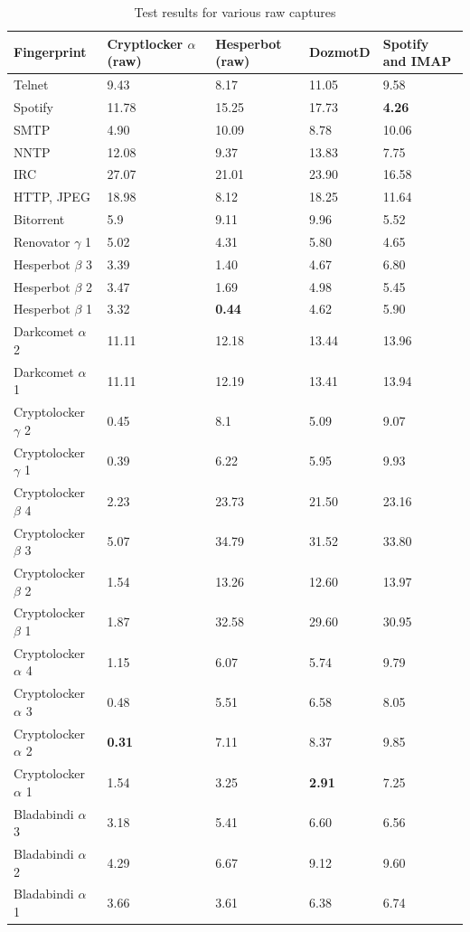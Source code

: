 \documentclass[9pt,journal,compsoc]{IEEEtran}
\begin{document}
\begin{table}[!ht]
\renewcommand{\arraystretch}{1.15}
\caption{Test results for various raw captures}
\label{table:testresults}

\begin{tabular}{|p{1.56cm}|p{1.4cm}|p{1.3cm}|p{1.2cm}|p{1.4cm}|}
\hline
Fingerprint& \textbf{Cryptlocker $\alpha$ (raw)}&\textbf{Hesperbot (raw)}&\textbf{DozmotD}&\textbf{Spotify and IMAP}\\
\hline
Telnet&9.43&8.17&11.05&9.58\\
\hline
Spotify&11.78&15.25&17.73&\textbf{4.26}\\
\hline
SMTP&4.90 &10.09&8.78&10.06\\
\hline
NNTP&12.08&9.37&13.83&7.75\\
\hline
IRC&27.07&21.01&23.90&16.58\\
\hline
HTTP, JPEG &18.98 &8.12&18.25&11.64\\
\hline
Bitorrent &5.9 &9.11&9.96&5.52\\
\hline
Renovator $\gamma$ 1 &5.02&4.31&5.80&4.65\\
\hline
Hesperbot $\beta$ 3 &3.39&1.40&4.67&6.80\\
\hline
Hesperbot $\beta$ 2 &3.47&1.69&4.98&5.45\\
\hline
Hesperbot $\beta$ 1 &3.32&\textbf{0.44}&4.62&5.90\\
\hline
Darkcomet $\alpha$ 2 &11.11&12.18&13.44&13.96\\
\hline
Darkcomet $\alpha$ 1 & 11.11&12.19&13.41&13.94\\
\hline
Cryptolocker $\gamma$ 2 &0.45&8.1&5.09&9.07\\
\hline
Cryptolocker $\gamma$ 1&0.39&6.22&5.95&9.93\\
\hline
Cryptolocker $\beta$ 4&2.23&23.73&21.50&23.16\\
\hline
Cryptolocker $\beta$ 3 &5.07&34.79&31.52&33.80\\
\hline
Cryptolocker $\beta$ 2&1.54&13.26&12.60&13.97\\
\hline
Cryptolocker $\beta$ 1&1.87&32.58&29.60&30.95\\
\hline
Cryptolocker $\alpha$ 4&1.15&6.07&5.74&9.79\\
\hline
Cryptolocker $\alpha$ 3&0.48&5.51&6.58&8.05\\
\hline
Cryptolocker $\alpha$ 2&\textbf{0.31}&7.11&8.37&9.85\\
\hline
Cryptolocker $\alpha$ 1&1.54&3.25&\textbf{2.91}&7.25\\
\hline
Bladabindi $\alpha$ 3&3.18&5.41&6.60&6.56\\
\hline
Bladabindi $\alpha$ 2&4.29&6.67&9.12&9.60\\
\hline
Bladabindi $\alpha$ 1&3.66&3.61&6.38&6.74\\
\hline
\end{tabular}
\\  
  

\end{table}
\end{document}
